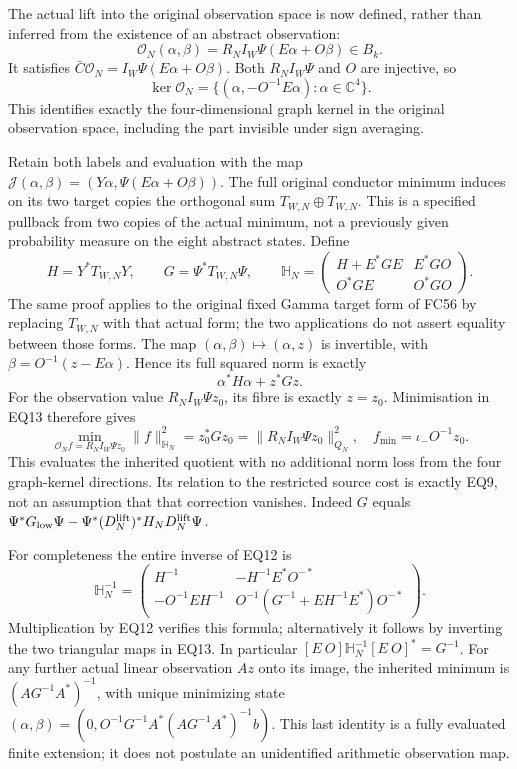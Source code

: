 \documentclass[11pt]{article}
\newcommand{\C}{\mathbb C}
\begin{document}
The actual lift into the original observation space is now defined,
rather than inferred from the existence of an abstract observation:
\[
 \mathcal O_N(\alpha,\beta)=R_NI_W\Psi(E\alpha+O\beta)\in B_k.
                                                                    \tag{EQ10}
\]
It satisfies $\bar C\mathcal O_N=I_W\Psi(E\alpha+O\beta)$.
Both $R_NI_W\Psi$ and $O$ are injective, so
\[
 \ker\mathcal O_N=\{(\alpha,-O^{-1}E\alpha):\alpha\in\C^4\}.
                                                                    \tag{EQ11}
\]
This identifies exactly the four-dimensional graph kernel in the
original observation space, including the part invisible under sign
averaging.

Retain both labels and evaluation with the map
$\mathcal J(\alpha,\beta)=(Y\alpha,\Psi(E\alpha+O\beta))$.
The full original conductor minimum induces on its two target copies
the orthogonal sum $T_{W,N}\oplus T_{W,N}$. This is a specified
pullback from two copies of the actual minimum, not a previously
given probability measure on the eight abstract states. Define
\[
 H=Y^*T_{W,N}Y,\qquad G=\Psi^*T_{W,N}\Psi,
 \qquad
 \mathbb H_N=\begin{pmatrix}
 H+E^*GE&E^*GO\\O^*GE&O^*GO
 \end{pmatrix}.                                                     \tag{EQ12}
\]
The same proof applies to the original fixed Gamma target form
of FC56 by replacing $T_{W,N}$ with that actual form; the two
applications do not assert equality between those forms.
The map $(\alpha,\beta)\mapsto(\alpha,z)$ is invertible, with
$\beta=O^{-1}(z-E\alpha)$. Hence its full squared norm is exactly
\[
 \alpha^*H\alpha+z^*Gz.                                             \tag{EQ13}
\]
For the observation value $R_NI_W\Psi z_0$, its fibre is exactly
$z=z_0$. Minimisation in EQ13 therefore gives
\[
 \boxed{\min_{\mathcal O_N f=R_NI_W\Psi z_0}\|f\|_{\mathbb H_N}^2
       =z_0^*Gz_0=\|R_NI_W\Psi z_0\|_{Q_N}^2,\quad
       f_{\min}=\iota_-O^{-1}z_0.}                                  \tag{EQ14}
\]
This evaluates the inherited quotient with no additional norm loss
from the four graph-kernel directions. Its relation to the restricted
source cost is exactly EQ9, not an assumption that that correction
vanishes. Indeed $G$ equals
$\Psi^*G_{\rm low}\Psi-\Psi^*(D_N^{\rm lift})^*H_ND_N^{\rm lift}\Psi$.

For completeness the entire inverse of EQ12 is
\[
 \mathbb H_N^{-1}=
 \begin{pmatrix}
 H^{-1}&-H^{-1}E^*O^{-*}\\
 -O^{-1}EH^{-1}&O^{-1}(G^{-1}+EH^{-1}E^*)O^{-*}
 \end{pmatrix}.                                                     \tag{EQ15}
\]
Multiplication by EQ12 verifies this formula; alternatively it
follows by inverting the two triangular maps in EQ13.
In particular $[E\ O]\mathbb H_N^{-1}[E\ O]^*=G^{-1}$.
For any further actual linear observation $A z$ onto its image,
the inherited minimum is $(AG^{-1}A^*)^{-1}$, with unique minimizing
state $(\alpha,\beta)=(0,O^{-1}G^{-1}A^*(AG^{-1}A^*)^{-1}b)$.
This last identity is a fully evaluated finite extension; it does not
postulate an unidentified arithmetic observation map.
\end{document}
